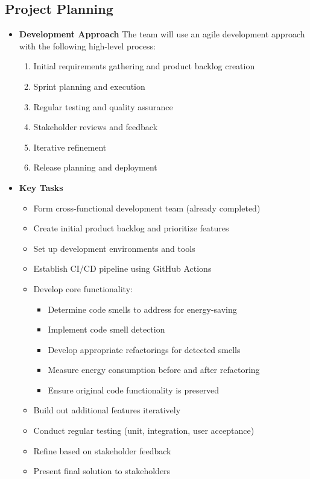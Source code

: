 \documentclass[12pt]{article}
\begin{document}
\subsection{Project Planning}
\begin{itemize}
 
  \item \textbf{Development Approach}
  The team will use an agile development approach with the following high-level process:
  \begin{enumerate}
    \item Initial requirements gathering and product backlog creation
    \item Sprint planning and execution
    \item Regular testing and quality assurance
    \item Stakeholder reviews and feedback
    \item Iterative refinement
    \item Release planning and deployment
  \end{enumerate}
  
 \item \textbf{Key Tasks}
  \begin{itemize}
    \item Form cross-functional development team (already completed) 
    \item Create initial product backlog and prioritize features
    \item Set up development environments and tools
    \item Establish CI/CD pipeline using GitHub Actions
    \item Develop core functionality:
      \begin{itemize}
        \item Determine code smells to address for energy-saving
        \item Implement code smell detection
        \item Develop appropriate refactorings for detected smells
        \item Measure energy consumption before and after refactoring
        \item Ensure original code functionality is preserved
      \end{itemize}
    \item Build out additional features iteratively
    \item Conduct regular testing (unit, integration, user acceptance)
    \item Refine based on stakeholder feedback
    \item Present final solution to stakeholders


\end{itemize}
\end{itemize}
\end{document}
